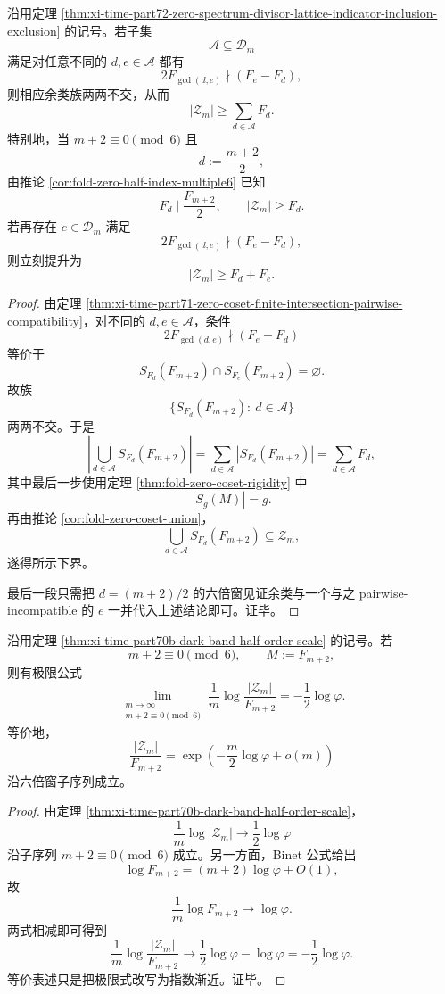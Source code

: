 \begin{corollary}\label{cor:xi-time-part72-zero-spectrum-pairwise-incompatible-linear-lower-bound}
沿用定理 \ref{thm:xi-time-part72-zero-spectrum-divisor-lattice-indicator-inclusion-exclusion} 的记号。若子集
\[
\mathcal A\subseteq \mathcal D_m
\]
满足对任意不同的 \(d,e\in\mathcal A\) 都有
\[
2F_{\gcd(d,e)}\nmid (F_e-F_d),
\]
则相应余类族两两不交，从而
\[
|\mathcal Z_m|
\ge
\sum_{d\in\mathcal A}F_d.
\]
特别地，当 \(m+2\equiv 0\pmod 6\) 且
\[
d:=\frac{m+2}{2},
\]
由推论 \ref{cor:fold-zero-half-index-multiple6} 已知
\[
F_d\mid \frac{F_{m+2}}{2},
\qquad
|\mathcal Z_m|\ge F_d.
\]
若再存在 \(e\in\mathcal D_m\) 满足
\[
2F_{\gcd(d,e)}\nmid (F_e-F_d),
\]
则立刻提升为
\[
|\mathcal Z_m|\ge F_d+F_e.
\]
\end{corollary}
\begin{proof}
由定理 \ref{thm:xi-time-part71-zero-coset-finite-intersection-pairwise-compatibility}，对不同的 \(d,e\in \mathcal A\)，条件
\[
2F_{\gcd(d,e)}\nmid (F_e-F_d)
\]
等价于
\[
S_{F_d}(F_{m+2})\cap S_{F_e}(F_{m+2})=\varnothing.
\]
故族
\[
\{S_{F_d}(F_{m+2}):\ d\in\mathcal A\}
\]
两两不交。于是
\[
\left|
\bigcup_{d\in\mathcal A}S_{F_d}(F_{m+2})
\right|
=
\sum_{d\in\mathcal A}|S_{F_d}(F_{m+2})|
=
\sum_{d\in\mathcal A}F_d,
\]
其中最后一步使用定理 \ref{thm:fold-zero-coset-rigidity} 中
\[
|S_g(M)|=g.
\]
再由推论 \ref{cor:fold-zero-coset-union}，
\[
\bigcup_{d\in\mathcal A}S_{F_d}(F_{m+2})
\subseteq
\mathcal Z_m,
\]
遂得所示下界。

最后一段只需把 \(d=(m+2)/2\) 的六倍窗见证余类与一个与之 pairwise-incompatible 的 \(e\) 一并代入上述结论即可。证毕。
\end{proof}

\begin{theorem}[六倍窗上谱零点相对密度的精确指数率]\label{thm:xi-time-part72-zero-density-exact-exponential-rate}
沿用定理 \ref{thm:xi-time-part70b-dark-band-half-order-scale} 的记号。若
\[
m+2\equiv 0\pmod 6,
\qquad
M:=F_{m+2},
\]
则有极限公式
\[
\lim_{\substack{m\to\infty\\ m+2\equiv 0\!\!\!\pmod 6}}
\frac{1}{m}\log\frac{|\mathcal Z_m|}{F_{m+2}}
=
-\frac12\log\varphi.
\]
等价地，
\[
\frac{|\mathcal Z_m|}{F_{m+2}}
=
\exp\!\left(
-\frac{m}{2}\log\varphi+o(m)
\right)
\]
沿六倍窗子序列成立。
\end{theorem}
\begin{proof}
由定理 \ref{thm:xi-time-part70b-dark-band-half-order-scale}，
\[
\frac{1}{m}\log |\mathcal Z_m|
\longrightarrow
\frac12\log\varphi
\]
沿子序列 \(m+2\equiv 0\pmod 6\) 成立。另一方面，Binet 公式给出
\[
\log F_{m+2}=(m+2)\log\varphi+O(1),
\]
故
\[
\frac{1}{m}\log F_{m+2}\longrightarrow \log\varphi.
\]
两式相减即可得到
\[
\frac{1}{m}\log\frac{|\mathcal Z_m|}{F_{m+2}}
\longrightarrow
\frac12\log\varphi-\log\varphi
=
-\frac12\log\varphi.
\]
等价表述只是把极限式改写为指数渐近。证毕。
\end{proof}

